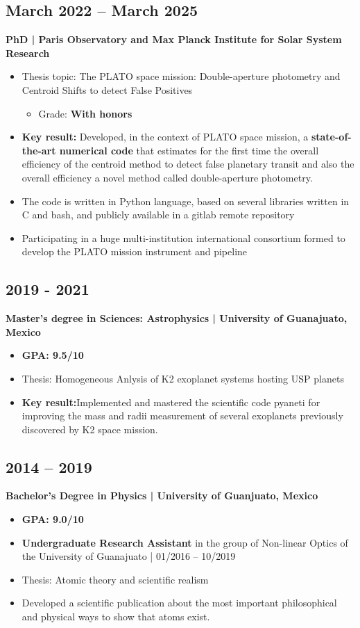 \documentclass[11pt,a4paper]{article}
\begin{document}
\begin{multicols}{2}
		\subsection{March 2022 – March 2025}
		\textbf{PhD | Paris Observatory and Max Planck Institute for Solar System Research}
		\begin{itemize}
			\item Thesis topic: The PLATO space mission: Double-aperture photometry and Centroid Shifts to detect False Positives
			\begin{itemize}
				\item Grade: \textbf{With honors}
			\end{itemize}
			\item \textbf{Key result:} Developed, in the context of PLATO space mission, a \textbf{state-of-the-art numerical code} that estimates for the first time the overall efficiency of the centroid method to detect false planetary transit and also the overall efficiency a novel method called double-aperture photometry.
			\item The code is written in Python language, based on several libraries written in C and bash, and publicly available in a gitlab remote repository
			\item Participating in a huge multi-institution international consortium formed to develop the PLATO mission instrument and pipeline
		\end{itemize}
		
		\subsection{2019 - 2021}
		\textbf{Master's degree in Sciences: Astrophysics | University of Guanajuato, Mexico}
		\begin{itemize}
		\item \textbf{GPA: 9.5/10}
		\item Thesis: Homogeneous Anlysis of K2 exoplanet systems hosting USP planets
		\item \textbf{Key result:}Implemented and mastered the scientific code pyaneti for improving the mass and radii measurement of several exoplanets previously discovered by K2 space mission. 
		\end{itemize}
		
		\subsection{2014 – 2019}
		\textbf{Bachelor's Degree in Physics | University of Guanjuato, Mexico}
		\begin{itemize}
			\item \textbf{GPA: 9.0/10}
			\item \textbf{Undergraduate Research Assistant} in the group of Non-linear Optics of the University of Guanajuato | 01/2016 – 10/2019
			\item Thesis: Atomic theory and scientific realism
			\item Developed a scientific publication about the most important philosophical and physical ways to show that atoms exist. 
		\end{itemize}
		

\end{multicols}
\end{document}
